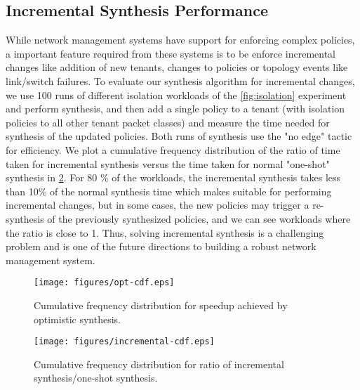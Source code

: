 \subsection{Incremental Synthesis Performance}
While network management systems have support for enforcing complex policies, 
a important feature required from these systems is to be enforce incremental changes
like addition of new tenants, changes to policies or topology events like link/switch 
failures. To evaluate our synthesis algorithm for incremental changes, we use 100 runs of 
different isolation workloads of the \cref{fig:isolation} experiment and perform synthesis, and then
add a single policy to a tenant (with isolation policies to all other tenant packet classes) and
measure the time needed for synthesis of the updated policies. Both runs of synthesis use the
"no edge" tactic for efficiency. We plot a cumulative frequency 
distribution of the ratio of time taken for incremental synthesis versus the time taken for normal 
"one-shot" synthesis in \cref{fig:incremental-cdf}. For 80 \% of the workloads, the incremental 
synthesis takes less than 10\% of the normal synthesis time which makes \Name suitable for 
performing incremental changes, but in some cases, the new policies may trigger a re-synthesis 
of the previously synthesized policies, and we can see workloads where the ratio is close to 1. 
Thus, solving incremental synthesis is a challenging problem and is one of the future directions
to building a robust network management system. 

%
%
\begin{figure}
	\texttt{[image: figures/opt-cdf.eps]}
	\caption{Cumulative frequency distribution for speedup achieved by optimistic synthesis.}
	\label{fig:opt-cdf}
\end{figure}
\begin{figure}
	\texttt{[image: figures/incremental-cdf.eps]}
	\caption{Cumulative frequency distribution for ratio of incremental synthesis/one-shot synthesis.}
	\label{fig:incremental-cdf}
\end{figure}




